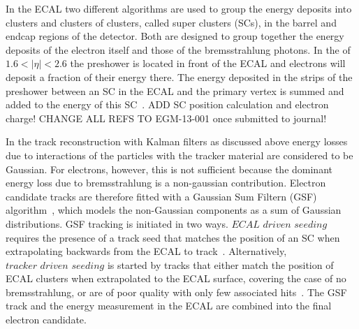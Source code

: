 In the ECAL two different algorithms are used to group the energy deposits into clusters and clusters of clusters, called super clusters (SCs), in the barrel and endcap regions of the detector. Both are designed to group together the energy deposits of the electron itself and those of the bremsstrahlung photons. In the of $1.6 < |\eta| < 2.6$ the preshower is located in front of the ECAL and electrons will deposit a fraction of their energy there. The energy deposited in the strips of the preshower between an SC in the ECAL and the primary vertex is summed and added to the energy of this SC~\cite{Anderson:1365024}. ADD SC position calculation and electron charge! CHANGE ALL REFS TO EGM-13-001 once submitted to journal!

In the track reconstruction with Kalman filters as discussed above energy losses due to interactions of the particles with the tracker material are considered to be Gaussian. For electrons, however, this is not sufficient because the dominant energy loss due to bremsstrahlung is a non-gaussian contribution. Electron candidate tracks are therefore fitted with a Gaussian Sum Filtern (GSF) algorithm~\cite{FruhwirtGSFCMS}, which models the non-Gaussian components as a sum of Gaussian distributions. GSF tracking is initiated in two ways. $\textit{ECAL driven seeding}$ requires the presence of a track seed that matches the position of an SC when extrapolating backwards from the ECAL to track~\cite{Baffioni:2006cd}. Alternatively, $\textit{tracker driven seeding}$ is started by tracks that either match the position of ECAL clusters when extrapolated to the ECAL surface, covering the case of no bremsstrahlung, or are of poor quality with only few associated hits~\cite{Chatrchyan:2014fea}. The GSF track and the energy measurement in the ECAL are combined into the final electron candidate. 

